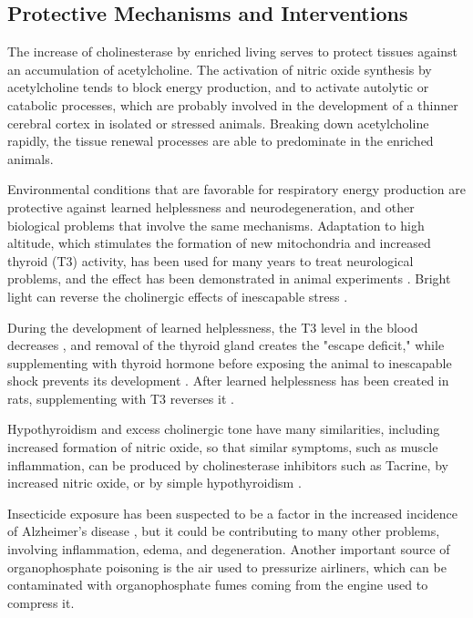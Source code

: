 \documentclass{article}
\begin{document}
\subsection{Protective Mechanisms and Interventions}
The increase of cholinesterase by enriched living serves to protect tissues against an accumulation of acetylcholine. The activation of nitric oxide synthesis by acetylcholine tends to block energy production, and to activate autolytic or catabolic processes, which are probably involved in the development of a thinner cerebral cortex in isolated or stressed animals. Breaking down acetylcholine rapidly, the tissue renewal processes are able to predominate in the enriched animals.

Environmental conditions that are favorable for respiratory energy production are protective against learned helplessness and neurodegeneration, and other biological problems that involve the same mechanisms. Adaptation to high altitude, which stimulates the formation of new mitochondria and increased thyroid (T3) activity, has been used for many years to treat neurological problems, and the effect has been demonstrated in animal experiments \cite{Manukhina2010}. Bright light can reverse the cholinergic effects of inescapable stress \cite{Flemmer1990}.

During the development of learned helplessness, the T3 level in the blood decreases \cite{Helmreich2006}, and removal of the thyroid gland creates the "escape deficit," while supplementing with thyroid hormone before exposing the animal to inescapable shock prevents its development \cite{Levine1990}. After learned helplessness has been created in rats, supplementing with T3 reverses it \cite{Massol1987a, Massol1988}.

Hypothyroidism and excess cholinergic tone have many similarities, including increased formation of nitric oxide, so that similar symptoms, such as muscle inflammation, can be produced by cholinesterase inhibitors such as Tacrine, by increased nitric oxide, or by simple hypothyroidism \cite{Jeyarasasingam2000, Franco2006}.

Insecticide exposure has been suspected to be a factor in the increased incidence of Alzheimer's disease \cite{Zaganas2013}, but it could be contributing to many other problems, involving inflammation, edema, and degeneration. Another important source of organophosphate poisoning is the air used to pressurize airliners, which can be contaminated with organophosphate fumes coming from the engine used to compress it.
\end{document}
